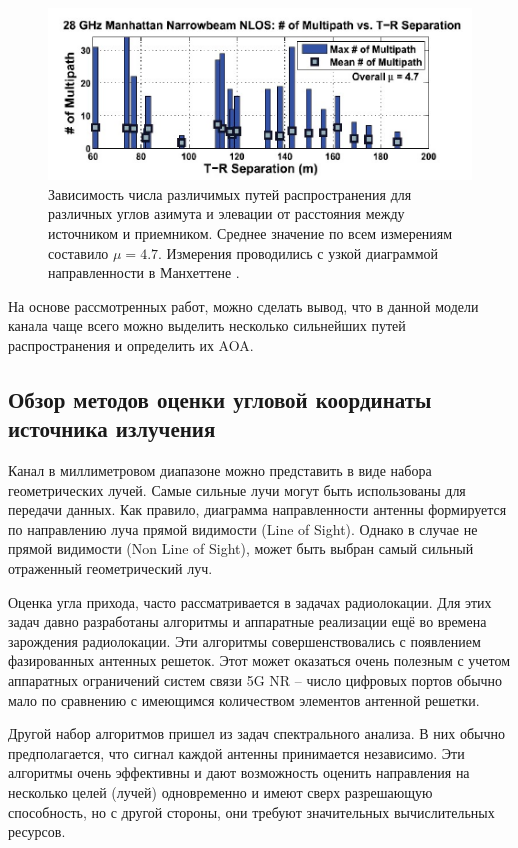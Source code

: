 \begin{figure}[ht!]
    \centering
    \includegraphics[width=0.8\linewidth]{figs/fig3.2}
    \caption{
        Зависимость числа различимых путей распространения для различных углов азимута и элевации от расстояния между источником и приемником.
        Среднее значение по всем измерениям составило $\mu=4.7$. Измерения проводились с узкой диаграммой направленности в Манхеттене \cite{Rappaport2015}.}
    \label{fig:3.2}
\end{figure}

На основе рассмотренных работ, можно сделать вывод, что в данной модели
канала чаще всего можно выделить несколько сильнейших путей
распространения и определить их AOA.

\subsection{Обзор методов оценки угловой координаты источника излучения}
\label{sec:review}

Канал в миллиметровом диапазоне можно представить в виде
набора геометрических лучей.  Самые сильные лучи могут быть
использованы для передачи данных. Как правило, диаграмма направленности
антенны формируется по направлению луча прямой видимости (Line of Sight).
Однако в случае не прямой видимости (Non Line of Sight), может быть
выбран самый сильный отраженный геометрический луч. 

Оценка угла прихода, часто рассматривается в задачах
радиолокации.  Для этих задач  давно разработаны алгоритмы и аппаратные реализации
ещё во времена зарождения радиолокации. Эти алгоритмы совершенствовались с
появлением фазированных антенных решеток.  
Этот может оказаться очень  полезным с учетом  аппаратных ограничений систем
связи 5G NR -- число цифровых портов обычно мало по сравнению с имеющимся
количеством элементов антенной решетки. 

Другой набор алгоритмов пришел из задач спектрального анализа.  В них обычно
предполагается, что сигнал каждой антенны принимается независимо.  Эти алгоритмы
очень эффективны и дают возможность оценить направления на несколько целей
(лучей) одновременно и имеют сверх разрешающую способность, но с другой стороны,
они требуют значительных вычислительных ресурсов.  

